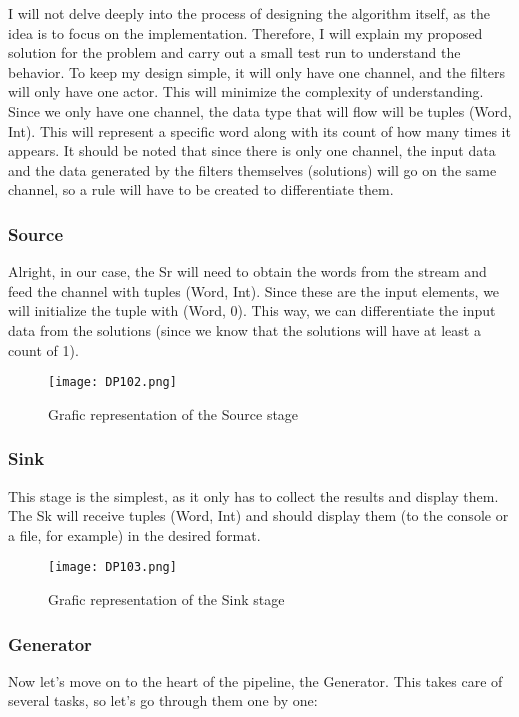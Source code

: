 I will not delve deeply into the process of designing the algorithm itself, as the idea is to focus on the implementation.
Therefore, I will explain my proposed solution for the problem and carry out a small test run to understand the behavior.
To keep my design simple, it will only have one channel, and the filters will only have one actor.
This will minimize the complexity of understanding. Since we only have one channel, the data type that will flow will be tuples (Word, Int).
This will represent a specific word along with its count of how many times it appears.
It should be noted that since there is only one channel, the input data and the data generated by the filters themselves (solutions) will go on the same channel, so a rule will have to be created to differentiate them.

\subsubsection*{Source}
Alright, in our case, the Sr will need to obtain the words from the stream and feed the channel with tuples (Word, Int).
Since these are the input elements, we will initialize the tuple with (Word, 0).
This way, we can differentiate the input data from the solutions (since we know that the solutions will have at least a count of 1).

\begin{figure}[H]
    \centering
    \texttt{[image: DP102.png]}
    \caption{Grafic representation of the Source stage}
    \label{fig:DP102}
\end{figure}

\subsubsection*{Sink}
This stage is the simplest, as it only has to collect the results and display them.
The Sk will receive tuples (Word, Int) and should display them (to the console or a file, for example) in the desired format.

\begin{figure}[H]
    \centering
    \texttt{[image: DP103.png]}
    \caption{Grafic representation of the Sink stage}
    \label{fig:DP103}
\end{figure}

\subsubsection*{Generator}
Now let's move on to the heart of the pipeline, the Generator.
This takes care of several tasks, so let's go through them one by one:

